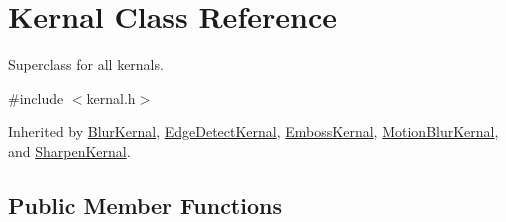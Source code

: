 \hypertarget{classKernal}{}\section{Kernal Class Reference}
\label{classKernal}


Superclass for all kernals.  




{\ttfamily \#include $<$kernal.\+h$>$}



Inherited by \hyperlink{classBlurKernal}{Blur\+Kernal}, \hyperlink{classEdgeDetectKernal}{Edge\+Detect\+Kernal}, \hyperlink{classEmbossKernal}{Emboss\+Kernal}, \hyperlink{classMotionBlurKernal}{Motion\+Blur\+Kernal}, and \hyperlink{classSharpenKernal}{Sharpen\+Kernal}.

\subsection*{Public Member Functions}

